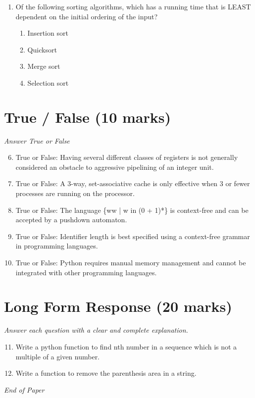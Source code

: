 \documentclass[12pt]{article}
\begin{document}
\begin{enumerate}[label=\arabic*.]
\begin{enumerate}[label=(\alph*)]
    \item Finding a shortest cycle in G
    \item Finding ALL spanning trees of G
    \item Finding a largest clique in G
\end{enumerate}
\item Of the following sorting algorithms, which has a running time that is LEAST dependent on the initial ordering of the input?
\begin{enumerate}[label=(\alph*)]
    \item Insertion sort
    \item Quicksort
    \item Merge sort
    \item Selection sort
\end{enumerate}
\end{enumerate}

\section*{True / False (10 marks)}
\textit{Answer True or False}
\begin{enumerate}[label=\arabic*.]
\setcounter{enumi}{5}
\item True or False: Having several different classes of registers is not generally considered an obstacle to aggressive pipelining of an integer unit.
\item True or False: A 3-way, set-associative cache is only effective when 3 or fewer processes are running on the processor.
\item True or False: The language \{ww | w in (0 + 1)*\} is context-free and can be accepted by a pushdown automaton.
\item True or False: Identifier length is best specified using a context-free grammar in programming languages.
\item True or False: Python requires manual memory management and cannot be integrated with other programming languages.
\end{enumerate}

\section*{Long Form Response (20 marks)}
\textit{Answer each question with a clear and complete explanation.}
\begin{enumerate}[label=\arabic*.]
\setcounter{enumi}{10}
\item Write a python function to find nth number in a sequence which is not a multiple of a given number.
\item Write a function to remove the parenthesis area in a string.
\end{enumerate}

\vfill
\noindent\textit{End of Paper}
\end{document}

